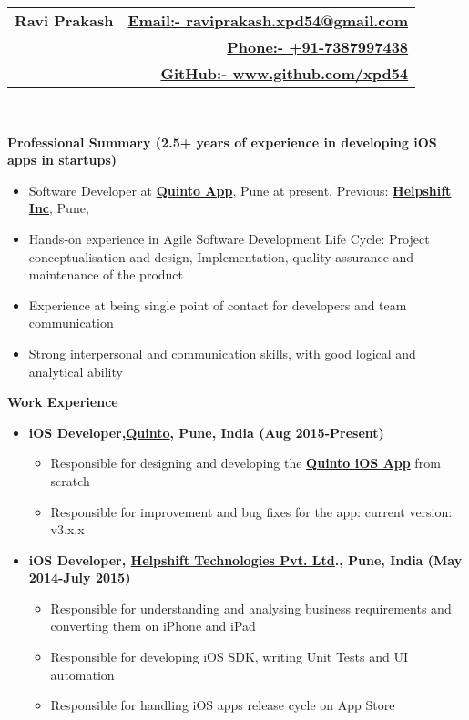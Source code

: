 \documentclass[letterpaper,11pt]{article}
\newcommand{\resitem}[1]{\item #1 \vspace{-2pt}}
\newcommand{\resheading}[1]{{\large \colorbox{mygrey}{\begin{minipage}{\textwidth}{\textbf{#1 \vphantom{p\^{E}}}}\end{minipage}}}}
\begin{document}
\newcommand{\mywebheader}{
\begin{tabular*}{7in}{l@{\extracolsep{\fill}}r}
	\textbf{\Huge \bfseries Ravi Prakash} 
	& \href{mailto:raviprakash.xpd54@gmail.com}{\normalsize \bfseries Email:- \mdseries raviprakash.xpd54@gmail.com}\\
	 & \href{tel:+91-7387997438}{\normalsize \bfseries Phone:- \mdseries +91-7387997438}\\ 
	 & \href{http://www.github.com/xpd54}{\normalsize \bfseries GitHub:- \mdseries www.github.com/xpd54}\\
	\end{tabular*}
\\}
\mywebheader

\resheading{\Large Professional Summary \normalsize \bfseries (2.5+ years of experience in developing iOS apps in startups)}
{ \footnotesize
\begin{itemize}
	\resitem{Software Developer at \href{http://quintoapp.com}{\bfseries Quinto App}, Pune at present. Previous: \href{helpshift.com} {\bfseries  Helpshift Inc}, Pune,}
	\resitem{Hands-on experience in Agile Software Development Life Cycle: Project conceptualisation and design, Implementation,
quality assurance and maintenance of the product}
	\resitem{Experience at being single point of contact for developers and team communication}
	\resitem{Strong interpersonal and communication skills, with good logical and analytical ability}
\end{itemize}
} %

\resheading{Work Experience}
	\begin{itemize}
	\resitem {{\bfseries iOS Developer,\href{http://quintoapp.com} {Quinto}, Pune, India (Aug 2015-Present)}}
				{ \footnotesize
				\begin{itemize}
					\resitem{Responsible for designing and developing the \href{https://itunes.apple.com/in/app/id912305961}{\bfseries Quinto iOS App} from scratch}
					\resitem{Responsible for improvement and bug fixes for the app: current version: v3.x.x}
				\end{itemize}
				}
	\resitem {{\bfseries iOS Developer, \href{https://helpshift.com}{\bfseries Helpshift Technologies Pvt. Ltd}., Pune, India (May 2014-July 2015)}}
				{ \footnotesize
				\begin{itemize}
					\resitem{Responsible for understanding and analysing business requirements and converting them on iPhone and iPad}
					\resitem{Responsible for developing iOS SDK, writing Unit Tests and UI automation}
					\resitem{Responsible for handling iOS apps release cycle on App Store}
				\end{itemize}
				}
\end{itemize}  %
\end{document}

